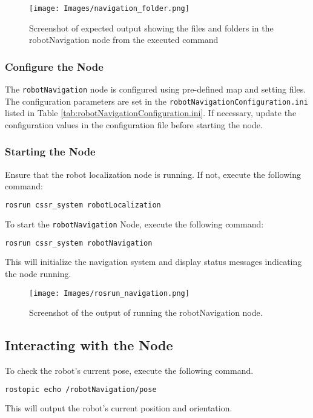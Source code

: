 \documentclass{CSSRforAfrica}
\begin{document}
\begin{figure}[H]
    \centering
    \texttt{[image: Images/navigation\_folder.png]}
    \caption{Screenshot of expected output showing the files and folders in the robotNavigation node from the executed command}
    \label{fig:sample robot navigation folder structure}
\end{figure}

\subsubsection*{Configure the Node}
The \verb|robotNavigation| node is configured using pre-defined map and setting files. The configuration parameters are set in the \verb|robotNavigationConfiguration.ini| listed in Table \ref{tab:robotNavigationConfiguration.ini}. If necessary, update the configuration values in the configuration file before starting the node.

\subsubsection*{Starting the Node}
\begin{notebox}
Ensure that the robot localization node is running. If not, execute the following command:
\begin{lstlisting}[style=withoutNumbering, language=bash]
rosrun cssr_system robotLocalization
\end{lstlisting}
\end{notebox}

\noindent To start the \verb|robotNavigation| Node, execute the following command:
\begin{lstlisting}[style=withoutNumbering, language=bash]
rosrun cssr_system robotNavigation
\end{lstlisting}
This will initialize the navigation system and display status messages indicating the node running.

\begin{figure}[H]
    \centering
    \texttt{[image: Images/rosrun\_navigation.png]}
    \caption{Screenshot of the output of running the robotNavigation node.}
    \label{fig:rosrun_navigation}
\end{figure}

\subsection{Interacting with the Node}
\noindent To check the robot's current pose, execute the following command.
\begin{lstlisting}[style=withoutNumbering, language=bash]
rostopic echo /robotNavigation/pose
\end{lstlisting}
\noindent This will output the robot’s current position and orientation.
\end{document}
